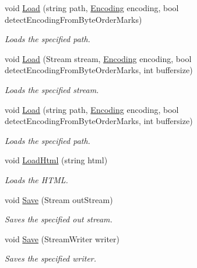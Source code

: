 \begin{DoxyCompactItemize}
void \hyperlink{class_html_agility_pack_1_1_html_document_ad4c7edeec9a99cd1f57cc8c0ae7889a6}{Load} (string path, \hyperlink{class_html_agility_pack_1_1_html_document_a220bdf28a5e35f4898075084be2d59f0}{Encoding} encoding, bool detect\+Encoding\+From\+Byte\+Order\+Marks)
\begin{DoxyCompactList}\small\item\em Loads the specified path. \end{DoxyCompactList}\item 
void \hyperlink{class_html_agility_pack_1_1_html_document_a6de59c92aa60dfe6f6561e8860f15996}{Load} (Stream stream, \hyperlink{class_html_agility_pack_1_1_html_document_a220bdf28a5e35f4898075084be2d59f0}{Encoding} encoding, bool detect\+Encoding\+From\+Byte\+Order\+Marks, int buffersize)
\begin{DoxyCompactList}\small\item\em Loads the specified stream. \end{DoxyCompactList}\item 
void \hyperlink{class_html_agility_pack_1_1_html_document_a553cb5a86bf0ee3ef5bfca82d4ac53da}{Load} (string path, \hyperlink{class_html_agility_pack_1_1_html_document_a220bdf28a5e35f4898075084be2d59f0}{Encoding} encoding, bool detect\+Encoding\+From\+Byte\+Order\+Marks, int buffersize)
\begin{DoxyCompactList}\small\item\em Loads the specified path. \end{DoxyCompactList}\item 
void \hyperlink{class_html_agility_pack_1_1_html_document_a79fc8e1cb117701ebed62d98ac266934}{Load\+Html} (string html)
\begin{DoxyCompactList}\small\item\em Loads the H\+T\+ML. \end{DoxyCompactList}\item 
void \hyperlink{class_html_agility_pack_1_1_html_document_a6b4268c9c7eef3ee96d47e6e9b6a2ee8}{Save} (Stream out\+Stream)
\begin{DoxyCompactList}\small\item\em Saves the specified out stream. \end{DoxyCompactList}\item 
void \hyperlink{class_html_agility_pack_1_1_html_document_a6f796eece6d20e32c1da69e762f43e3b}{Save} (Stream\+Writer writer)
\begin{DoxyCompactList}\small\item\em Saves the specified writer. \end{DoxyCompactList}\item 

\end{DoxyCompactItemize}
